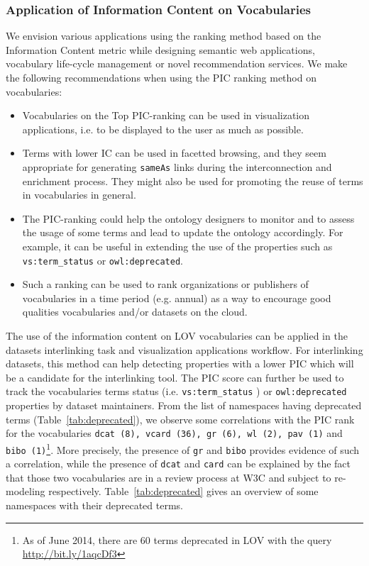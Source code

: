 \subsubsection{Application of Information Content on Vocabularies}
\label{sec:application}
We envision various applications using the ranking method based on the Information Content metric while designing semantic web applications, vocabulary life-cycle management or novel recommendation services. We make the following recommendations when using the PIC ranking method on vocabularies:
\begin{itemize}
 \item Vocabularies on the Top PIC-ranking can be used in visualization applications, i.e. to be displayed to the user as much as possible.
 \item Terms with lower IC can be used in facetted browsing, and they seem appropriate for generating \texttt{sameAs} links during the interconnection and enrichment process. They might also be used for promoting the reuse of terms in vocabularies in general.
 \item The PIC-ranking could help the ontology designers to monitor and to assess the usage of some terms and lead to update the ontology accordingly. For example, it can be useful in extending the use of the properties such as \texttt{vs:term\_status} or \texttt{owl:deprecated}.
 \item Such a ranking can be used to rank organizations or publishers of vocabularies in a time period (e.g. annual) as a way to encourage good qualities vocabularies and/or datasets on the cloud.
\end{itemize}
The use of the information content on LOV vocabularies can be applied in the datasets interlinking task and visualization applications workflow. For interlinking datasets, this method can help detecting properties with a lower PIC which will be a candidate for the interlinking tool. The PIC score can further be used to track the vocabularies terms status (i.e. \texttt{vs:term\_status} ) or \texttt{owl:deprecated} properties by dataset maintainers. From the list of namespaces having deprecated terms (Table~\ref{tab:deprecated}), we observe some correlations with the PIC rank for the vocabularies \texttt{dcat (8), vcard (36), gr (6), wl (2), pav (1)} and \texttt{bibo (1)}\footnote{As of June 2014, there are 60 terms deprecated in LOV with the query \url{http://bit.ly/1aqcDf3}}. More precisely, the presence of \texttt{gr} and \texttt{bibo} provides evidence of such a correlation, while the presence of \texttt{dcat} and \texttt{card} can be explained by the fact that those two vocabularies are in a review process at W3C and subject to re-modeling respectively. Table~\ref{tab:deprecated} gives an overview of some namespaces with their deprecated terms.

